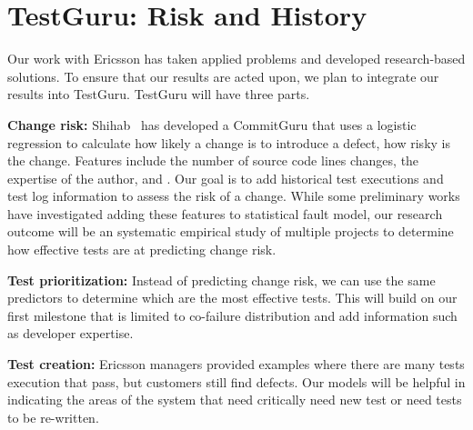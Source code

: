 \section{TestGuru: Risk and History}

Our work with Ericsson has taken applied problems and developed research-based solutions. To ensure that our results are acted upon, we plan to integrate our results into TestGuru. TestGuru will have three parts. 

\textbf{Change risk:} Shihab~\cite{} has developed a CommitGuru that uses a logistic regression to calculate how likely a change is to introduce a defect, \ie how risky is the change. Features include the number of source code lines changes, the expertise of the author, and . Our goal is to add historical test executions and test log information to assess the risk of a change. While some preliminary works have investigated adding these features to statistical fault model\cite{herzig,others}, our research outcome will be an systematic empirical study of multiple projects to determine how effective tests are at predicting change risk.

\textbf{Test prioritization:} Instead of predicting change risk, we can use the same predictors to determine which are the most effective tests. This will build on our first milestone that is limited to co-failure distribution and add information such as developer expertise. 

\textbf{Test creation:} Ericsson managers provided examples where there are many tests execution that pass, but customers still find defects. Our models will be helpful in indicating the areas of the system that need critically need new test or need tests to be re-written.


